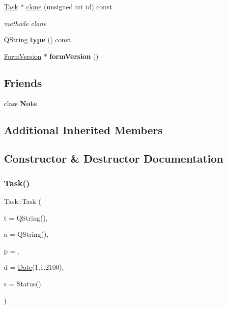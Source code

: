 \begin{DoxyCompactItemize}
\hyperlink{class_task}{Task} $\ast$ \hyperlink{class_task_a1bbd4cedca0617ce64237e90af5a797a}{clone} (unsigned int id) const
\begin{DoxyCompactList}\small\item\em methode clone \end{DoxyCompactList}\item 
\mbox{\label{class_task_ab7c7359a7703a41d4a46773443679213}} 
Q\+String {\bfseries type} () const
\item 
\mbox{\label{class_task_a9fd0d2efe3910eb438bbff7076a41d24}} 
\hyperlink{class_form_version}{Form\+Version} $\ast$ {\bfseries form\+Version} ()
\end{DoxyCompactItemize}
\subsection*{Friends}
\begin{DoxyCompactItemize}
\item 
\mbox{\label{class_task_a93d7e72623acdfa5b079a11fbf2d9f9d}} 
class {\bfseries Note}
\end{DoxyCompactItemize}
\subsection*{Additional Inherited Members}


\subsection{Constructor \& Destructor Documentation}
\mbox{\label{class_task_a848131e6d6b7132cb77d636a3e2794c7}} 
\subsubsection{\texorpdfstring{Task()}{Task()}}
{\footnotesize\ttfamily Task\+::\+Task (\begin{DoxyParamCaption}\item[{const Q\+String \&}]{t = {\ttfamily QString()},  }\item[{const Q\+String \&}]{a = {\ttfamily QString()},  }\item[{unsigned int}]{p = {},  }\item[{const \hyperlink{class_date}{Date}}]{d = {\ttfamily \hyperlink{class_date}{Date}(1,1,2100)},  }\item[{const Status}]{s = {\ttfamily Status()} }\end{DoxyParamCaption})}



